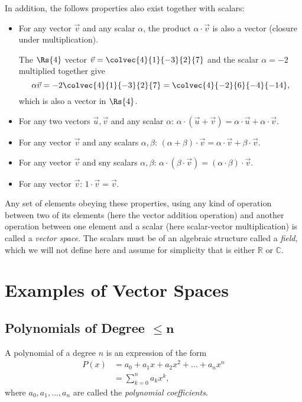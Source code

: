 In addition, the follows properties also exist together with scalars:
\begin{itemize}
  \item For any vector $\vec{v}$ and any scalar $\alpha$, the product $\alpha\cdot\vec{v}$ is also a vector (closure under multiplication).
    \begin{example}
      The $\Rs{4}$ vector $\vec{v}=\colvec{4}{1}{-3}{2}{7}$ and the scalar $\alpha=-2$ multiplied together give
      \begin{equation*}
        \alpha\vec{v} = -2\colvec{4}{1}{-3}{2}{7} = \colvec{4}{-2}{6}{-4}{-14},
      \end{equation*}
      which is also a vector in $\Rs{4}$.
    \end{example}
  \item For any two vectors $\vec{u}, \vec{v}$ and any scalar $\alpha$: $\alpha\cdot\left( \vec{u}+\vec{v} \right) = \alpha\cdot\vec{u} + \alpha\cdot\vec{v}$.
  \item For any vector $\vec{v}$ and any scalars $\alpha, \beta$: $\left( \alpha+\beta \right)\cdot\vec{v} = \alpha\cdot\vec{v} + \beta\cdot\vec{v}$.
  \item For any vector $\vec{v}$ and sny scalars $\alpha, \beta$: $\alpha\cdot\left( \beta\cdot\vec{v} \right) = \left( \alpha\cdot\beta \right)\cdot\vec{v}$.
  \item For any vector $\vec{v}$: $1\cdot\vec{v} = \vec{v}$.
\end{itemize}

Any set of elements obeying these properties, using any kind of operation between two of its elements (here the vector addition operation) and another operation between one element and a scalar (here scalar-vector multiplication) is called a \emph{vector space}. The scalars must be of an algebraic structure called a \emph{field}, which we will not define here and assume for simplicity that is either $\mathbb{R}$ or $\mathbb{C}$.

\section{Examples of Vector Spaces}
\subsection{Polynomials of Degree $\mathbf{\leq n}$}
A polynomial of a degree $n$ is an expression of the form
\begin{align*}
  P(x) &= a_{0} + a_{1}x + a_{2}x^{2} + \dots + a_{n}x^{n}\\
  &= \sum\limits_{k=0}^{n} a_{k}x^{k},
\end{align*}
where $a_{0}, a_{1}, \dots, a_{n}$ are called the \emph{polynomial coefficients}.

